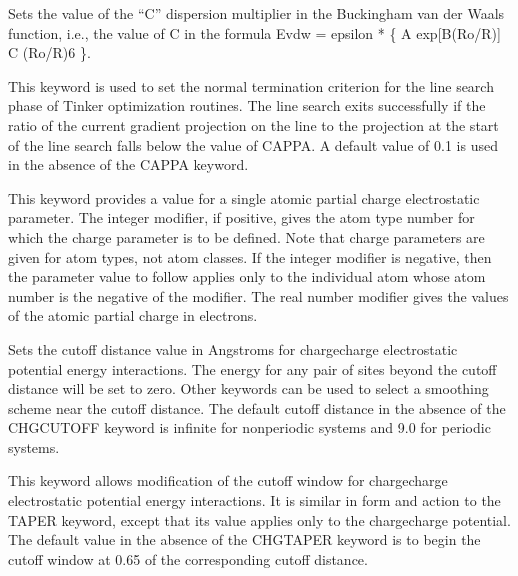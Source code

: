 \documentclass[letterpaper,11pt,english]{sphinxmanual}
\begin{document}
  Sets the value of the “C” dispersion multiplier in the Buckingham van der Waals function, i.e., the value of C in the formula Evdw = epsilon * \{ A exp{[}\sphinxhyphen{}B(Ro/R){]} \sphinxhyphen{} C (Ro/R)6 \}.

  This keyword is used to set the normal termination criterion for the line search phase of Tinker optimization routines. The line search exits successfully if the ratio of the current gradient projection on the line to the projection at the start of the line search falls below the value of CAPPA. A default value of 0.1 is used in the absence of the CAPPA keyword.



  This keyword provides a value for a single atomic partial charge electrostatic parameter. The integer modifier, if positive, gives the atom type number for which the charge parameter is to be defined. Note that charge parameters are given for atom types, not atom classes. If the integer modifier is negative, then the parameter value to follow applies only to the individual atom whose atom number is the negative of the modifier. The real number modifier gives the values of the atomic partial charge in electrons.

  Sets the cutoff distance value in Angstroms for charge\sphinxhyphen{}charge electrostatic potential energy interactions. The energy for any pair of sites beyond the cutoff distance will be set to zero. Other keywords can be used to select a smoothing scheme near the cutoff distance. The default cutoff distance in the absence of the CHG\sphinxhyphen{}CUTOFF keyword is infinite for nonperiodic systems and 9.0 for periodic systems.


  This keyword allows modification of the cutoff window for charge\sphinxhyphen{}charge electrostatic potential energy interactions. It is similar in form and action to the TAPER keyword, except that its value applies only to the charge\sphinxhyphen{}charge potential. The default value in the absence of the CHG\sphinxhyphen{}TAPER keyword is to begin the cutoff window at 0.65 of the corresponding cutoff distance.
\end{document}
